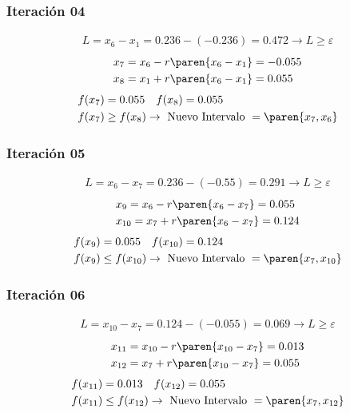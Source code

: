 \begin{homeworkProblem}
\subsubsection{Iteración 04}
\begin{align*}
    L=x_6-x_1=0.236-(-0.236)=0.472 \rightarrow L \geq \varepsilon
\end{align*}
\begin{align*}
    &x_7=x_6 - r\paren{x_6-x_1}= -0.055 \\
    &x_8=x_1 + r\paren{x_6-x_1}= 0.055
\end{align*}
\begin{align*}
    &f(x_7)=0.055 \quad f(x_8)=0.055 \\
    &f(x_7) \geq f(x_8) \rightarrow \text{ Nuevo Intervalo } = \paren{x_7,x_6}
\end{align*}

\subsubsection{Iteración 05}
\begin{align*}
    L=x_6-x_7=0.236-(-0.55)=0.291 \rightarrow L \geq \varepsilon
\end{align*}
\begin{align*}
    &x_9=x_6 - r\paren{x_6-x_7}= 0.055\\
    &x_{10}=x_7 + r\paren{x_6-x_7}= 0.124
\end{align*}
\begin{align*}
    &f(x_9)=0.055 \quad f(x_{10})=0.124 \\
    &f(x_9) \leq f(x_{10}) \rightarrow \text{ Nuevo Intervalo } = \paren{x_7,x_{10}}
\end{align*}


\subsubsection{Iteración 06}
\begin{align*}
    L=x_{10}-x_7=0.124-(-0.055)=0.069 \rightarrow L \geq \varepsilon
\end{align*}
\begin{align*}
    &x_{11}=x_{10} - r\paren{x_{10}-x_7}= 0.013\\
    &x_{12}=x_7 + r\paren{x_{10}-x_7}= 0.055
\end{align*}
\begin{align*}
    &f(x_{11})=0.013 \quad f(x_{12})=0.055 \\
    &f(x_{11}) \leq f(x_{12}) \rightarrow \text{ Nuevo Intervalo } = \paren{x_7,x_{12}}
\end{align*}


\end{homeworkProblem}
